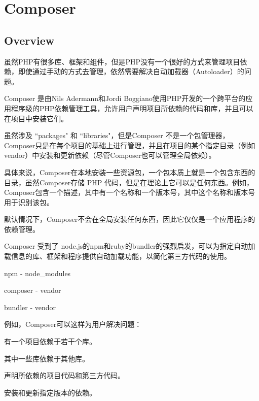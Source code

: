 \part{Composer}



\chapter{Overview}

虽然PHP有很多库、框架和组件，但是PHP没有一个很好的方式来管理项目依赖，即使通过手动的方式去管理，依然需要解决自动加载器（Autoloader）的问题。

Composer 是由Nils Adermann和Jordi Boggiano使用PHP开发的一个跨平台的应用程序级的PHP依赖管理工具，允许用户声明项目所依赖的代码和库，并且可以在项目中安装它们。

虽然涉及 ``packages" 和 ``libraries"，但是Composer 不是一个包管理器，Composer只是在每个项目的基础上进行管理，并且在项目的某个指定目录（例如 vendor）中安装和更新依赖（尽管Composer也可以管理全局依赖）。

具体来说，Composer在本地安装一些资源包，一个包本质上就是一个包含东西的目录，虽然Composer存储 PHP 代码，但是在理论上它可以是任何东西。例如，Composer包含一个描述，其中有一个名称和一个版本号，其中这个名称和版本号用于识别该包。

默认情况下，Composer不会在全局安装任何东西，因此它仅仅是一个应用程序的依赖管理。

Composer 受到了 node.js的npm和ruby的bundler的强烈启发，可以为指定自动加载信息的库、框架和程序提供自动加载功能，以简化第三方代码的使用。

\begin{compactitem}
\item npm - node\_modules
\item composer - vendor
\item bundler - vendor
\end{compactitem}

例如，Composer可以这样为用户解决问题：

\begin{compactenum}
\item 有一个项目依赖于若干个库。

\item 其中一些库依赖于其他库。

\item 声明所依赖的项目代码和第三方代码。

\item 安装和更新指定版本的依赖。
\end{compactenum}

